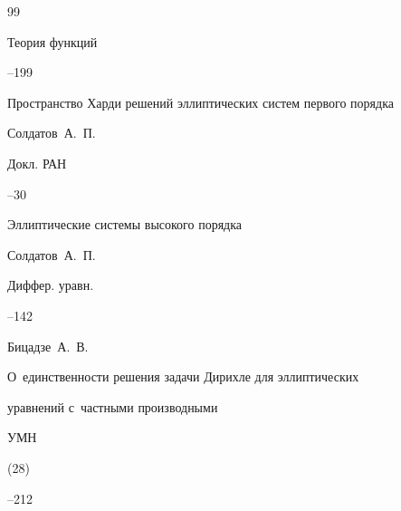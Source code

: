 \begin{thebibliography}{99}


\volinfo Теория функций

--199








\paper Пространство Харди решений эллиптических систем первого порядка

\by Солдатов~А.~П.

\jour Докл. РАН




--30







\paper Эллиптические системы высокого порядка

\by Солдатов~А.~П.

\jour Диффер. уравн.




--142







\by Бицадзе~А.~В.

\paper О~единственности решения задачи Дирихле для эллиптических

уравнений с~частными производными

\jour УМН



(28)

--212










\end{thebibliography}
